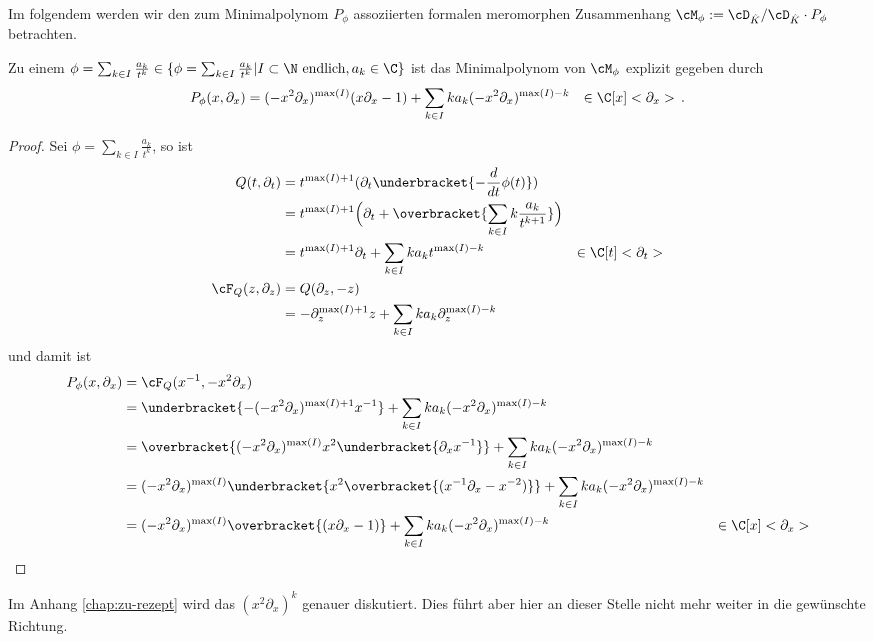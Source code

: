 Im folgendem werden wir den zum Minimalpolynom $P_\phi$ assoziierten formalen
meromorphen Zusammenhang $\cM_\phi:=\cD_{\hat K}/\cD_{\hat K}\cdot P_{\phi}$
betrachten.

\begin{lem}
Zu einem $\phi=\sum_{k\in I}\frac{a_k}{t^{k}}\in \{\phi=\sum_{k\in
I}\frac{a_k}{t^{k}}|I\subset\N\mbox{ endlich} ,a_k\in \C\}$ ist das
Minimalpolynom von $\cM_\phi$ explizit gegeben durch
\begin{align*}
P_{\phi}(x,\partial_x) &=(-x^2\partial_x)^{\max(I)} (x\partial_x-1)
   +\sum_{k\in I}k a_k(-x^2\partial_x)^{\max(I)-k} & \in \C[x]<\partial_x> \,.
\end{align*}
\end{lem}
\begin{proof}
Sei $\phi=\sum_{k\in I}\frac{a_k}{t^{k}}$, so ist
\begin{align*}
Q(t,\partial_t) &= t^{\max(I)+1}(\partial_t\underbracket{-\frac{d}{dt}\phi(t)})
\\&=t^{\max(I)+1}\Big(
    \partial_t+\overbracket{\sum_{k\in I} k\frac{a_k}{t^{k+1}}}\Big)
\\&=t^{\max(I)+1}\partial_t +\sum_{k\in I}k a_k t^{\max(I)-k}
  & \in \C[t]<\partial_t>
\\\cF_Q(z,\partial_z) &=Q(\partial_z,-z)
\\&=-\partial_z^{\max(I)+1}z +\sum_{k\in I}k a_k\partial_z^{\max(I)-k}
\end{align*}
und damit ist
\begin{align*}
P_{\phi}(x,\partial_x) &=\cF_Q(x^{-1},-x^2\partial_x)
\\&=\underbracket{-(-x^2\partial_x)^{\max(I)+1}x^{-1}}
  +\sum_{k\in I}k a_k(-x^2\partial_x)^{\max(I)-k}
\\&=\overbracket{(-x^2\partial_x)^{\max(I)} x^2\underbracket{\partial_xx^{-1}}}
   +\sum_{k\in I}k a_k(-x^2\partial_x)^{\max(I)-k}
\\&=(-x^2\partial_x)^{\max(I)}
   \underbracket{ x^2 \overbracket{(x^{-1}\partial_x-x^{-2})} }
   +\sum_{k\in I}k a_k(-x^2\partial_x)^{\max(I)-k}
\\&=(-x^2\partial_x)^{\max(I)} \overbracket{(x\partial_x-1)}
   +\sum_{k\in I}k a_k(-x^2\partial_x)^{\max(I)-k}
  & \in \C[x]<\partial_x>
\end{align*}
\end{proof}
Im Anhang \ref{chap:zu-rezept} wird das $(x^2\partial_x)^{k}$ genauer
diskutiert. Dies führt aber hier an dieser Stelle nicht mehr weiter in die
gewünschte Richtung.

